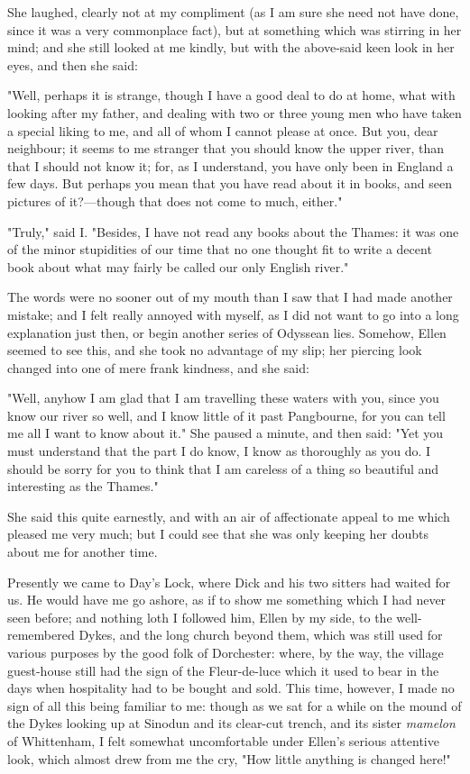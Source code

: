 She laughed, clearly not at my compliment (as I am sure she need not
have done, since it was a very commonplace fact), but at something which
was stirring in her mind; and she still looked at me kindly, but with
the above-said keen look in her eyes, and then she said:

"Well, perhaps it is strange, though I have a good deal to do at home,
what with looking after my father, and dealing with two or three young
men who have taken a special liking to me, and all of whom I cannot
please at once. But you, dear neighbour; it seems to me stranger that
you should know the upper river, than that I should not know it; for, as
I understand, you have only been in England a few days. But perhaps you
mean that you have read about it in books, and seen pictures of
it?---though that does not come to much, either."

"Truly," said I. "Besides, I have not read any books about the Thames:
it was one of the minor stupidities of our time that no one thought fit
to write a decent book about what may fairly be called our only English
river."

The words were no sooner out of my mouth than I saw that I had made
another mistake; and I felt really annoyed with myself, as I did not
want to go into a long explanation just then, or begin another series of
Odyssean lies. Somehow, Ellen seemed to see this, and she took no
advantage of my slip; her piercing look changed into one of mere frank
kindness, and she said:

"Well, anyhow I am glad that I am travelling these waters with you,
since you know our river so well, and I know little of it past
Pangbourne, for you can tell me all I want to know about it." She paused
a minute, and then said: "Yet you must understand that the part I do
know, I know as thoroughly as you do. I should be sorry for you to think
that I am careless of a thing so beautiful and interesting as the
Thames."

She said this quite earnestly, and with an air of affectionate appeal to
me which pleased me very much; but I could see that she was only keeping
her doubts about me for another time.

Presently we came to Day's Lock, where Dick and his two sitters had
waited for us. He would have me go ashore, as if to show me something
which I had never seen before; and nothing loth I followed him, Ellen by
my side, to the well-remembered Dykes, and the long church beyond them,
which was still used for various purposes by the good folk of
Dorchester: where, by the way, the village guest-house still had the
sign of the Fleur-de-luce which it used to bear in the days when
hospitality had to be bought and sold. This time, however, I made no
sign of all this being familiar to me: though as we sat for a while on
the mound of the Dykes looking up at Sinodun and its clear-cut trench,
and its sister \emph{mamelon} of Whittenham, I felt somewhat
uncomfortable under Ellen's serious attentive look, which almost drew
from me the cry, "How little anything is changed here!"

